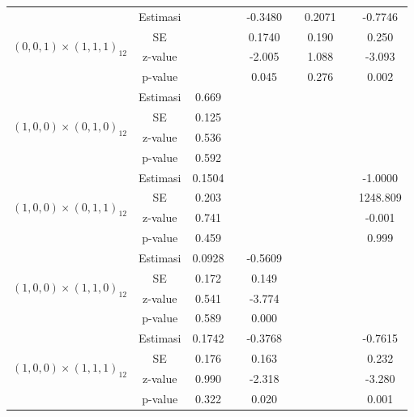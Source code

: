 \begin{enumerate}[label=\alph*.]
\begin{longtable}{|c|c|c|c|c|c|c|c|c|}
            \multirow{4}{*}{$(0,0,1)\times(1,1,1)_{12}$}
            & Estimasi & {} & {} & -0.3480 & {} & 0.2071 & {} & -0.7746 \\ \cline{2-9} 
            & SE       & {} & {} & 0.1740   & {} & 0.190 & {} & 0.250\\ \cline{2-9}
            & z-value  & {} & {} & -2.005  & {} & 1.088 & {} & -3.093\\ \cline{2-9}
            & p-value  & {} & {} & 0.045   & {} & 0.276 & {} & 0.002\\ \hline

            \multirow{4}{*}{$(1,0,0)\times(0,1,0)_{12}$}
            & Estimasi & 0.669  & {} & {} & {} & {} & {} & {} \\ \cline{2-9}
            & SE       & 0.125 & {} & {} & {} & {} & {} & {} \\ \cline{2-9}
            & z-value  & 0.536   & {} & {} & {} & {} & {} & {}\\ \cline{2-9}
            & p-value  & 0.592 & {} & {} & {} & {} & {} & {} \\ \hline

            \multirow{4}{*}{$(1,0,0)\times(0,1,1)_{12}$}
            & Estimasi & 0.1504  & {} & {} & {} & {} & {} & -1.0000 \\ \cline{2-9}
            & SE       & 0.203  & {} & {} & {} & {} & {} & 1248.809\\ \cline{2-9}
            & z-value  & 0.741   & {} & {} & {} & {} & {} & -0.001\\ \cline{2-9}
            & p-value  & 0.459 & {} & {} & {} & {} & {} & 0.999\\ \hline

            \multirow{4}{*}{$(1,0,0)\times(1,1,0)_{12}$}
            & Estimasi & 0.0928  & {} & -0.5609 & {} & {} & {} & {}\\ \cline{2-9}
            & SE       & 0.172  & {} & 0.149 & {} & {} & {} & {}\\ \cline{2-9}
            & z-value  & 0.541   & {} & -3.774 & {} & {} & {}& {}\\ \cline{2-9}
            & p-value  & 0.589 & {} & 0.000 & {} & {} & {} & {}\\ \hline

            \multirow{4}{*}{$(1,0,0)\times(1,1,1)_{12}$}
            & Estimasi & 0.1742  & {} & -0.3768 & {} & {} & {} & -0.7615 \\ \cline{2-9}
            & SE       & 0.176    & {} & 0.163 & {} & {} & {} & 0.232\\ \cline{2-9}
            & z-value  & 0.990  & {} & -2.318 & {} & {} & {} & -3.280\\ \cline{2-9}
            & p-value  & 0.322   & {} &  0.020 & {} & {} & {} & 0.001\\ \hline


\end{longtable}
\end{enumerate}
